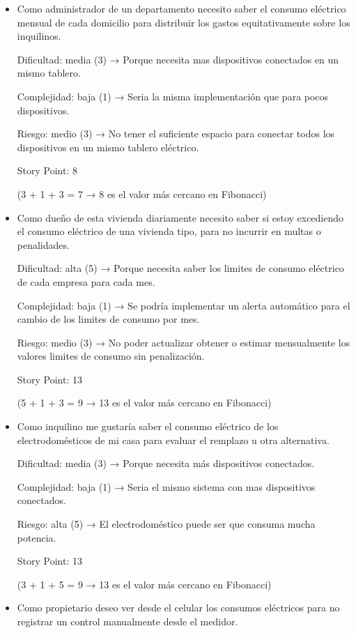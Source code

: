 \documentclass[
11pt, %
]{charter}
\begin{document}
\begin{itemize}

\item{Como administrador  de un departamento necesito saber el consumo eléctrico mensual de cada domicilio para distribuir los gastos equitativamente sobre los inquilinos.}


Dificultad: media (3) → Porque necesita mas dispositivos conectados en un mismo tablero.

Complejidad: baja (1) → Seria la misma implementación que para pocos dispositivos.

Riesgo: medio (3) → No tener el suficiente espacio para conectar todos los dispositivos en un mismo tablero eléctrico.

Story Point: 8 

(3 + 1 + 3 = 7 → 8 es el valor más cercano en Fibonacci)


\item{Como dueño de esta vivienda diariamente necesito saber  si estoy excediendo  el consumo eléctrico de una vivienda tipo, para no incurrir en multas o penalidades.
}

Dificultad: alta (5) → Porque necesita saber los limites de consumo eléctrico de cada empresa para cada mes.

Complejidad: baja (1) → Se podría implementar un alerta automático para el cambio de los limites de consumo por mes. 

Riesgo: medio (3) → No poder actualizar obtener o estimar mensualmente los valores limites de consumo sin penalización. 

Story Point: 13 

(5 + 1 + 3 = 9 → 13 es el valor más cercano en Fibonacci)

\item{Como inquilino me gustaría saber el consumo eléctrico de los electrodomésticos de mi casa para evaluar el remplazo u otra alternativa.
}

Dificultad: media (3) → Porque necesita más dispositivos conectados.

Complejidad: baja (1) → Seria el mismo sistema con mas dispositivos conectados.

Riesgo: alta (5) → El electrodoméstico puede ser que consuma mucha potencia.

Story Point: 13 

(3 + 1 + 5 = 9 → 13 es el valor más cercano en Fibonacci)

\item{Como propietario deseo ver desde el celular los consumos eléctricos para no registrar un control manualmente desde el medidor.}



\end{itemize}
\end{document}
